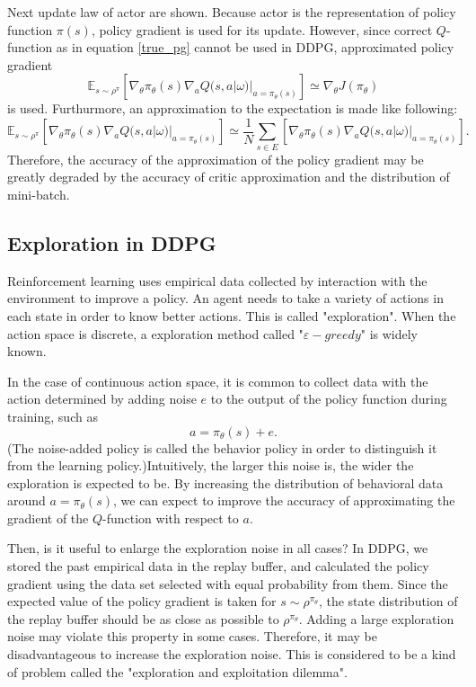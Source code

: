 \documentclass[english, dvipdfmx]{ampmt}             %
\newcommand{\expect}{\mathbb{E}}
\begin{document}
Next update law of actor are shown. Because actor is the representation of policy function $\pi(s)$, policy gradient is used for its update. However, since correct $Q$-function as in equation \eqref{true_pg} cannot be used in DDPG, approximated policy gradient
\begin{equation}
	\expect_{s\sim\rho^{\pi}}[\nabla_{\theta}\pi_{\theta}(s)\nabla_{a}Q(s, a|\omega)|_{a=\pi_{\theta}(s)}] \simeq \nabla_{\theta}J(\pi_{\theta}) 
\end{equation}
 is used. Furthurmore, an approximation to the expectation is made like following:
 \begin{equation}
	\expect_{s\sim\rho^{\pi}}[\nabla_{\theta}\pi_{\theta}(s)\nabla_{a}Q(s, a|\omega)|_{a=\pi_{\theta}(s)}] \simeq \frac{1}{N}\sum_{s\in E}[\nabla_{\theta}\pi_{\theta}(s)\nabla_{a}Q(s, a|\omega)|_{a=\pi_{\theta}(s)}]. \label{expectation_approximation}
\end{equation}
Therefore, the accuracy of the approximation of the policy gradient may be greatly degraded by the accuracy of critic approximation and the distribution of mini-batch.

\subsection{Exploration in DDPG}
\label{sec:exploration}
Reinforcement learning uses empirical data collected by interaction with the environment to improve a policy. An agent needs to take a variety of actions in each state in order to know better actions. This is called "exploration". When the action space is discrete, a exploration method called "$\varepsilon - greedy$" is widely known. \par
In the case of continuous action space, it is common to collect data with the action determined by adding noise $e$ to the output of the policy function during training, such as
\begin{equation}
	a = \pi_{\theta}(s) + e.
\end{equation}
(The noise-added policy is called the behavior policy in order to distinguish it from the learning policy.)Intuitively, the larger this noise is, the wider the exploration is expected to be. By increasing the distribution of behavioral data around $a=\pi_{\theta}(s)$, we can expect to improve the accuracy of approximating the gradient of the $Q$-function with respect to $a$. \par
Then, is it useful to enlarge the exploration noise in all cases? In DDPG, we stored the past empirical data in the replay buffer, and calculated the policy gradient using the data set selected with equal probability from them. Since the expected value of the policy gradient is taken for $s\sim\rho^{\pi_{\theta}}$, the state distribution of the replay buffer should be as close as possible to $\rho^{\pi_{\theta}}$. Adding a large exploration noise may violate this property in some cases. Therefore, it may be disadvantageous to increase the exploration noise. This is considered to be a kind of problem called the "exploration and exploitation dilemma".
\end{document}
